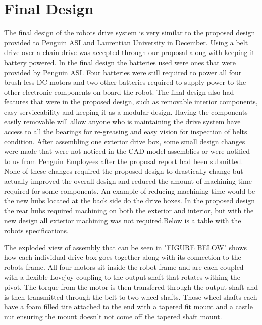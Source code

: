 \section{Final Design}
The final design of the robots drive system is very similar to the proposed design provided to Penguin ASI and Laurentian University in December. Using a belt drive over a chain drive was accepted through our proposal along with keeping it battery powered. In the final design the batteries used were ones that were provided by Penguin ASI. Four batteries were still required to power all four brush-less DC motors and two other batteries required to supply power to the other electronic components on board the robot. The final design also had features that were in the proposed design, such as removable interior components, easy serviceability and keeping it as a modular design. Having the components easily removable will allow anyone who is maintaining the drive system have access to all the bearings for re-greasing and easy vision for inspection of belts condition.  After assembling one exterior drive box, some small design changes were made that were not noticed in the CAD model assemblies or were notified to us from Penguin Employees after the proposal report had been submitted. None of these changes required the proposed design to drastically change but actually improved the overall design and reduced the amount of machining time required for some components. An example of reducing machining time would be the new hubs located at the back side do the drive boxes. In the proposed design the rear hubs required machining on both the exterior and interior, but with the new design all exterior machining was not required.Below is a table with the robots specifications.

The exploded view of assembly that can be seen in "FIGURE BELOW" shows how each individual drive box goes together along with its connection to the robots frame. All four motors sit inside the robot frame and are each coupled with a flexible Lovejoy coupling to the output shaft that rotates withing the pivot. The torque from the motor is then transfered through the output shaft and is then transmitted through the belt to two wheel shafts. Those wheel shafts each have a foam filled tire attached to the end with a tapered fit mount and a castle nut ensuring the mount doesn't not come off the tapered shaft mount.




